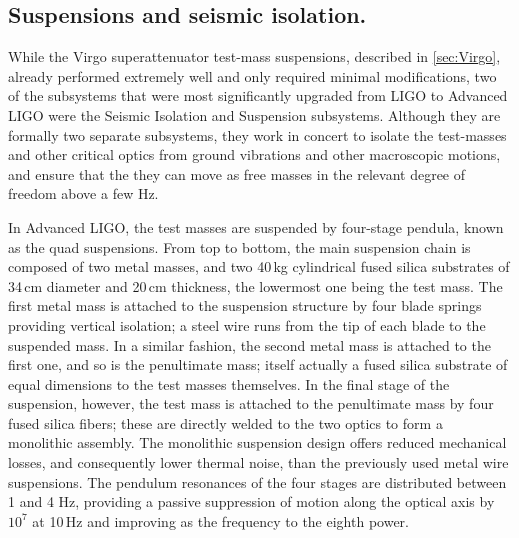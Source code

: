 \subsection{Suspensions and seismic isolation.}
While the Virgo superattenuator test-mass suspensions, described in \autoref{sec:Virgo}, already performed extremely well and only required minimal modifications, two of the subsystems that were most significantly upgraded from LIGO to Advanced LIGO were the Seismic Isolation\cite{SEI2015} and Suspension subsystems.
Although they are formally two separate subsystems, they work in concert to isolate the test-masses and  other critical optics from ground vibrations and other macroscopic motions, and ensure that the they can move as free masses in the relevant degree of freedom above a few Hz.

In Advanced LIGO, the test masses are suspended by four-stage pendula, known as the quad suspensions\cite{Aston_2012}. 
From top to bottom, the main suspension chain is composed of two metal masses, and two 40\,kg cylindrical fused silica substrates
of 34\,cm diameter and 20\,cm thickness, the lowermost one being the test mass.
The first metal mass is attached to the suspension structure by four blade springs providing vertical isolation;
a steel wire runs from the tip of each blade to the 
suspended mass.
In a similar fashion, the second metal mass is attached to the first one, 
and so is the penultimate mass; itself actually a fused silica substrate of equal dimensions to the test masses themselves. 
In the final stage of the suspension, however, the test mass 
is attached to the penultimate mass by four fused silica fibers; these are directly welded to 
the two optics to form a monolithic assembly.
The monolithic suspension design offers reduced mechanical losses, and
consequently lower thermal noise, than the previously used metal wire suspensions.
The pendulum resonances of the four stages are 
distributed between 1 and 4 Hz, providing a passive suppression of motion along 
the optical axis by $10^7$ at 10\,Hz and improving as the frequency to the eighth power.

